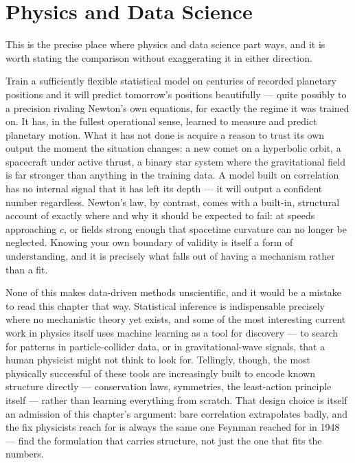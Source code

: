\documentclass[12pt]{book}
\begin{document}
\section{Physics and Data Science}
\label{sec:data-science}

This is the precise place where physics and data science part ways, and it is worth stating the comparison without exaggerating it in either direction.

Train a sufficiently flexible statistical model on centuries of recorded planetary positions and it will predict tomorrow's positions beautifully --- quite possibly to a precision rivaling Newton's own equations, for exactly the regime it was trained on. It has, in the fullest operational sense, learned to measure and predict planetary motion. What it has not done is acquire a reason to trust its own output the moment the situation changes: a new comet on a hyperbolic orbit, a spacecraft under active thrust, a binary star system where the gravitational field is far stronger than anything in the training data. A model built on correlation has no internal signal that it has left its depth --- it will output a confident number regardless. Newton's law, by contrast, comes with a built-in, structural account of exactly where and why it should be expected to fail: at speeds approaching $c$, or fields strong enough that spacetime curvature can no longer be neglected. Knowing your own boundary of validity is itself a form of understanding, and it is precisely what falls out of having a mechanism rather than a fit.

None of this makes data-driven methods unscientific, and it would be a mistake to read this chapter that way. Statistical inference is indispensable precisely where no mechanistic theory yet exists, and some of the most interesting current work in physics itself uses machine learning as a tool for discovery --- to search for patterns in particle-collider data, or in gravitational-wave signals, that a human physicist might not think to look for. Tellingly, though, the most physically successful of these tools are increasingly built to encode known structure directly --- conservation laws, symmetries, the least-action principle itself --- rather than learning everything from scratch. That design choice is itself an admission of this chapter's argument: bare correlation extrapolates badly, and the fix physicists reach for is always the same one Feynman reached for in 1948 --- find the formulation that carries structure, not just the one that fits the numbers.
\end{document}
